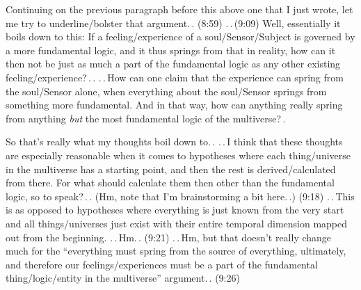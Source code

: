 \documentclass{report}
\begin{document}
Continuing on the previous paragraph before this above one that I just wrote, let me try to underline/bolster that argument.\,. (8:59) .\,.\,(9:09) Well, essentially it boils down to this: If a feeling/experience of a soul/Sensor/Subject is governed by a more fundamental logic, and it thus springs from that in reality, how can it then not be just as much a part of the fundamental logic as any other existing feeling/experience?\,.\,. .\,.\,How can one claim that the experience can spring from the soul/Sensor alone, when everything about the soul/Sensor springs from something more fundamental. And in that way, how can anything really spring from anything \emph{but} the most fundamental logic of the multiverse?\,.

So that's really what my thoughts boil down to.\,. .\,.\,I think that these thoughts are especially reasonable when it comes to hypotheses where each thing/universe in the multiverse has a starting point, and then the rest is derived/calculated from there. For what should calculate them then other than the fundamental logic, so to speak?\,.\,. (Hm, note that I'm brainstorming a bit here.\,.) (9:18) .\,.\,This is as opposed to hypotheses where everything is just known from the very start and all things/universes just exist with their entire temporal dimension mapped out from the beginning. .\,.\,Hm.\,. (9:21) .\,.\,Hm, but that doesn't really change much for the ``everything must spring from the source of everything, ultimately, and therefore our feelings/experiences must be a part of the fundamental thing/logic/entity in the multiverse'' argument.\,. (9:26)
\end{document}
